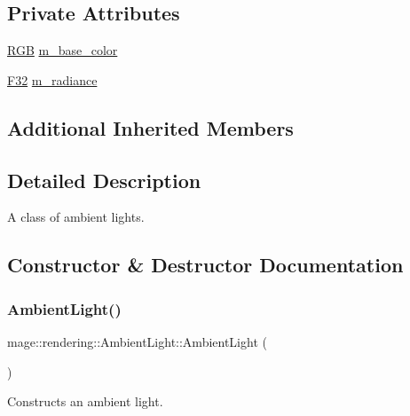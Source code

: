 \subsection*{Private Attributes}
\begin{DoxyCompactItemize}
\item 
\mbox{\hyperlink{structmage_1_1_r_g_b}{R\+GB}} \mbox{\hyperlink{classmage_1_1rendering_1_1_ambient_light_a28527ee932d424f43686c1abe9c0f3ec}{m\+\_\+base\+\_\+color}}
\item 
\mbox{\hyperlink{namespacemage_aa97e833b45f06d60a0a9c4fc22ae02c0}{F32}} \mbox{\hyperlink{classmage_1_1rendering_1_1_ambient_light_adfdafe01958a72df46eeb3c0f5f0d0c4}{m\+\_\+radiance}}
\end{DoxyCompactItemize}
\subsection*{Additional Inherited Members}


\subsection{Detailed Description}
A class of ambient lights. 

\subsection{Constructor \& Destructor Documentation}
\mbox{\label{classmage_1_1rendering_1_1_ambient_light_a178327bf02552f65b98ad3858416a81d}} 
\subsubsection{\texorpdfstring{Ambient\+Light()}{AmbientLight()}\hspace{0.1cm}{\footnotesize\ttfamily [1/3]}}
{\footnotesize\ttfamily mage\+::rendering\+::\+Ambient\+Light\+::\+Ambient\+Light (\begin{DoxyParamCaption}{ }\end{DoxyParamCaption})\hspace{0.3cm}{\ttfamily [noexcept]}}

Constructs an ambient light. \mbox{\label{classmage_1_1rendering_1_1_ambient_light_a363ca4f79eef6f0a95a2e3d381479af1}} 
